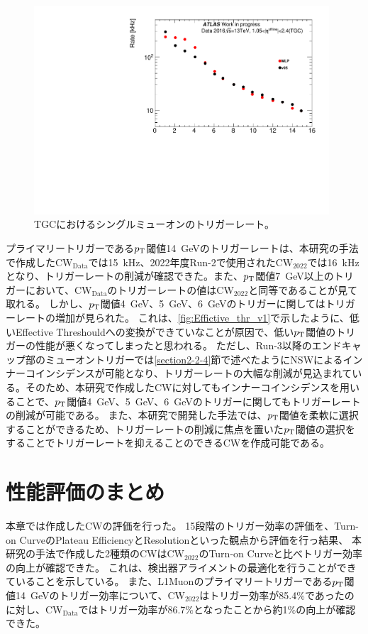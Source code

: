 \begin{figure}[tb]
  \centering
  \includegraphics[clip, width=11cm]{fig/5/15rate.pdf}
  \caption{TGCにおけるシングルミューオンのトリガーレート。}
  \label{fig:Ratev05v06}
\end{figure}
プライマリートリガーである$p_{\rm{T}}$閾値14~GeVのトリガーレートは、本研究の手法で作成した$\mathrm{CW_{Data}}$では15~kHz、2022年度Run-2で使用された$\mathrm{CW_{2022}}$では16~kHzとなり、トリガーレートの削減が確認できた。また、$p_{\rm{T}}$閾値7~GeV以上のトリガーにおいて、$\mathrm{CW_{Data}}$のトリガーレートの値は$\mathrm{CW_{2022}}$と同等であることが見て取れる。
しかし、$p_{\rm{T}}$閾値4~GeV、5~GeV、6~GeVのトリガーに関してはトリガーレートの増加が見られた。
これは、\ref{fig:Effictive_thr_v1}で示したように、低いEffective Threshouldへの変換ができていなことが原因で、低い$p_{\rm{T}}$閾値のトリガーの性能が悪くなってしまったと思われる。
ただし、Run-3以降のエンドキャップ部のミューオントリガーでは\ref{section2-2-4}節で述べたようにNSWによるインナーコインシデンスが可能となり、トリガーレートの大幅な削減が見込まれている。そのため、本研究で作成したCWに対してもインナーコインシデンスを用いることで、$p_{\rm{T}}$閾値4~GeV、5~GeV、6~GeVのトリガーに関してもトリガーレートの削減が可能である。
また、本研究で開発した手法では、$p_{\rm{T}}$閾値を柔軟に選択することができるため、トリガーレートの削減に焦点を置いた$p_{\rm{T}}$閾値の選択をすることでトリガーレートを抑えることのできるCWを作成可能である。



\section{性能評価のまとめ}
本章では作成したCWの評価を行った。
15段階のトリガー効率の評価を、Turn-on CurveのPlateau EfficiencyとResolutionといった観点から評価を行っ結果、
本研究の手法で作成した2種類のCWは$\mathrm{CW_{2022}}$のTurn-on Curveと比べトリガー効率の向上が確認できた。
これは、検出器アライメントの最適化を行うことができていることを示している。
また、L1Muonのプライマリートリガーである$p_{\rm{T}}$閾値14~GeVのトリガー効率について、$\mathrm{CW_{2022}}$はトリガー効率が85.4$\%$であったのに対し、$\mathrm{CW_{Data}}$ではトリガー効率が86.7$\%$となったことから約1$\%$の向上が確認できた。

